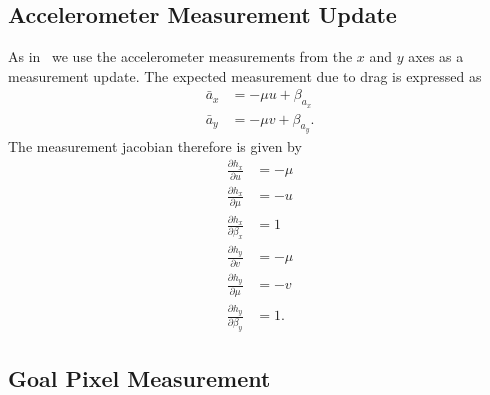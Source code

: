 \subsection{Accelerometer Measurement Update}
As in~\cite{leishman2014accel} we use the accelerometer measurements from the
$x$ and $y$ axes as a measurement update. The expected measurement due to drag
is expressed as
\begin{align}
  \bar{a}_x &= -\mu u + \beta_{a_x} \\
  \bar{a}_y &= -\mu v + \beta_{a_y}.
\end{align}
The measurement jacobian therefore is given by
\begin{align}
  \frac{\partial h_x}{\partial u} &= -\mu \\
  \frac{\partial h_x}{\partial \mu} &= -u \\
  \frac{\partial h_x}{\partial \beta_x} &= 1 \\
  \frac{\partial h_y}{\partial v} &= -\mu \\
  \frac{\partial h_y}{\partial \mu} &= -v \\
  \frac{\partial h_y}{\partial \beta_y} &= 1.
\end{align}

\subsection{Goal Pixel Measurement}
